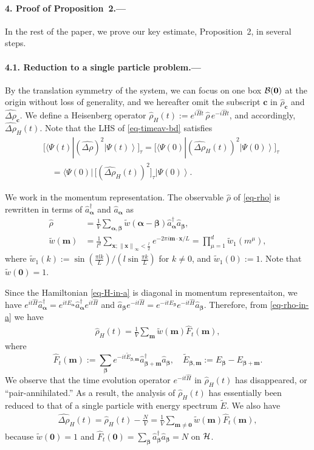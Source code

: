 \documentclass[aps,prl,superscriptaddress,reprint]{revtex4-2}
\newcommand{\se}[1]{\paragraph{#1.---}}
\theoremstyle{definition}
\newcommand{\HH}{{\cal H}}
\newcommand{\ket}[1]{\left|{#1}\right\rangle}
\newcommand{\bra}[1]{\langle{#1}|}
\newcommand{\sw}[2]{\bra{#1}{#2}\ket{#1}}
\newcommand{\ti}{\tilde}
\newcommand{\ha}{\hat}
\newcommand{\wh}{\widehat}
\newcommand{\da}[1]{#1^\dag}
\newcommand{\ta}{\tau}
\renewcommand{\a}{\alpha}
\renewcommand{\b}{\beta}
\newcommand{\De}{\varDelta}
\newcommand{\m}{\mu}
\renewcommand{\r}{\rho}
\newcommand{\f}{\frac}
\newcommand{\ve}[1]{\boldsymbol{#1}}
\newcommand{\norminf}[1]{\left\|#1\right\|_\infty}
\newcommand{\xx}{{\ve x}}
\renewcommand{\aa}{{\ve \a}}
\newcommand{\bb}{{\ve \b}}
\newcommand{\mm}{{\ve m}}
\newcommand{\zz}{{\ve 0}}
\newcommand{\bo}[1]{{\cal B}(#1)}
\begin{document}
\se{4. Proof of Proposition~2}

In the rest of the paper, we prove our key estimate, Proposition~2, in several steps.

\se{4.1. Reduction to a single particle problem}
By the translation symmetry of the system,
we can focus on one box $\bo{\zz}$ at the origin without loss of generality, and
we hereafter omit the subscript $\ve c$
in $\ha \r_{\ve c}$ and $\wh{\De\r}_{\ve c}$.
We define a Heisenberg operator
$\ha\r_H(t):=e^{i\hat{H} t}\,\ha{\r}\,e^{-i\hat{H} t}$,
and accordingly, $\wh{\De\r}_H(t)$.
Note that the LHS of \eqref{eq-timeav-bd} satisfies
\begin{align}
	&
	\bigl [ \sw{\Psi(t)}{(\wh{\De\r})^2} \bigr ]_\ta
	=
	\bigl [ \bra{\Psi(0)} (\wh{\De\r}_H(t))^2 \ket{\Psi(0)} \bigr ]_\tau
	\nonumber
	\\
	&
	\quad = \bra{\Psi(0)} \, \bigl [ (\wh{\De\r}_H(t))^2 \bigr ]_\tau \ket{\Psi(0)}
	.
	\label{eq-LHSprop2-rewrite1}
\end{align}


We work in the momentum representation.
The observable $\ha\r$ of
\eqref{eq-rho} is rewritten in terms of
$\da {\ha a}_\aa$ and ${\ha a}_\aa$ as
\begin{align}
  	\ha\r
  	&=
  	\f1{V}\sum_{\aa,\bb}
  	\ti w(\aa-\bb)\da {\ha a}_{\aa}{\ha a}_{\bb},
  	\label{eq-rho-in-a}
    \\
  	\ti w(\mm)
  	&=
  	\f1{l^d}\sum_{\xx; \norminf \xx<\f l2}
  	e^{-2 \pi i\mm\cdot\xx / L}
  	=
    \prod_{\m=1}^d \ti w_1(m^\m),
    \label{eq-tiw}
\end{align}
where
$\ti w_1(k):={\sin(\f{\pi lk}L)}\big/({l\sin\f{\pi k}L})$ for $k \neq 0$,
and $\ti w_1(0) := 1$.
Note that $\ti w(\zz)=1$.




Since the Hamiltonian \eqref{eq-H-in-a} is diagonal
in momentum representaiton,
we have
$
  e^{it\ha H}\da{\ha a}_\aa =
  e^{itE_\aa} \da{\ha a}_\aa e^{it\ha H}$ and
${\ha a}_\bb e^{-it\ha H}=e^{-itE_\bb}e^{-it\ha H}{\ha a}_\bb
$.
Therefore, from
\eqref{eq-rho-in-a}
we have
\begin{align}
	\ha\r_H(t)
  	=
  	\f1V\sum_{\mm} \ti w(\mm)\ha F_t(\mm),
    \label{eq-rho-in-a-2}
\end{align}
where
\begin{equation}
	\ha F_t(\mm):=  \sum_{\bb}
	e^{-it\ti E_{\bb,\mm}}
	\hat{a}^\dagger_{\bb+\ve m}\hat{a}_{\bb},
	\quad
	\ti E_{\bb,\mm}:=E_\bb-E_{\bb+\mm} .
	\label{eq-Etilde-def.11}
\end{equation}
We observe that the
time evolution operator
$e^{-it\ha H}$ in $\ha\r_H(t)$ has disappeared,
or ``pair-annihilated.''
As a result, the analysis of
$\ha\r_H(t)$ has essentially been reduced to that of a
single particle with energy spectrum $\ti E$.
We also have
\begin{align}
	\wh{\De\r}_H(t)=\ha\r_H(t)-\frac{N}{V}
	= \frac{1}{V}\sum_{\mm\ne\zz}\ti w(\mm)\ha F_t(\mm),
	\label{eq-drt-by-mneq0}
\end{align}
because $\ti w(\zz)=1$ and
$\ha F_t(\zz)=\sum_{\bb}\da {\ha a}_\bb {\ha a}_\bb=N$ on $\HH$.
\end{document}
